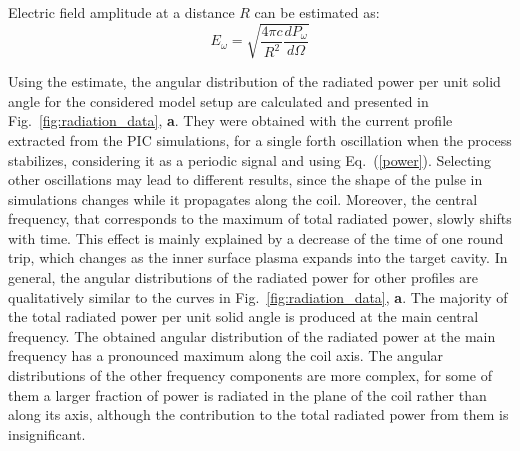 \documentclass[aps,prl,twocolumn,superscriptaddress]{revtex4-1}
\begin{document}
Electric field amplitude at a distance $R$ can be estimated as:
\begin{equation}
    \label{eqn:electric_field}
    E_{\omega} = \sqrt{\frac{4 \pi c}{R^2}  \frac{dP_{\omega}}{d\Omega}}
\end{equation}

Using the estimate, the angular distribution of the radiated power per unit solid angle for the considered model setup are calculated and presented in Fig.~\ref{fig:radiation_data}, \textbf{a}. They were obtained with the current profile extracted from the PIC simulations, for a single forth oscillation when the process stabilizes, considering it as a periodic signal and using Eq.~(\ref{power}). Selecting other oscillations may lead to different results, since the shape of the pulse in simulations changes while it propagates along the coil. Moreover, the central frequency, that corresponds to the maximum of total radiated power, slowly shifts with time. This effect is mainly explained by a decrease of the time of one round trip, which changes as the inner surface plasma expands into the target cavity. In general, the angular distributions of the radiated power for other profiles are qualitatively similar to the curves in Fig.~\ref{fig:radiation_data}, \textbf{a}. The majority of the total radiated power per unit solid angle is produced at the main central frequency. The obtained angular distribution of the radiated power at the main frequency has a pronounced maximum along the coil axis. The angular distributions of the other frequency components are more complex, for some of them a larger fraction of power is radiated in the plane of the coil rather than along its axis, although the contribution to the total radiated power from them is insignificant.
\end{document}
